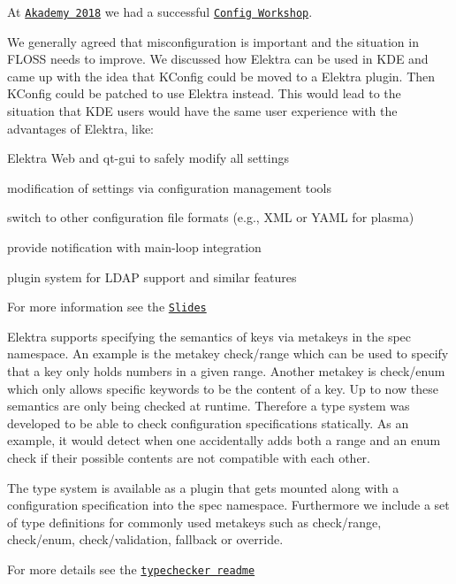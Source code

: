 At \href{https://akademy.kde.org/2018}{\tt Akademy 2018} we had a successful \href{https://community.kde.org/Akademy/2018/Config_Workshop}{\tt Config Workshop}.

We generally agreed that misconfiguration is important and the situation in F\+L\+O\+SS needs to improve. We discussed how Elektra can be used in K\+DE and came up with the idea that K\+Config could be moved to a Elektra plugin. Then K\+Config could be patched to use Elektra instead. This would lead to the situation that K\+DE users would have the same user experience with the advantages of Elektra, like\+:


\begin{DoxyItemize}
\item Elektra Web and qt-\/gui to safely modify all settings
\item modification of settings via configuration management tools
\item switch to other configuration file formats (e.\+g., X\+ML or Y\+A\+ML for plasma)
\item provide notification with main-\/loop integration
\item plugin system for L\+D\+AP support and similar features
\end{DoxyItemize}

For more information see the \href{http://www.complang.tuwien.ac.at/raab/akademy.pdf}{\tt Slides}

Elektra supports specifying the semantics of keys via metakeys in the {\ttfamily spec} namespace. An example is the metakey {\ttfamily check/range} which can be used to specify that a key only holds numbers in a given range. Another metakey is {\ttfamily check/enum} which only allows specific keywords to be the content of a key. Up to now these semantics are only being checked at runtime. Therefore a type system was developed to be able to check configuration specifications statically. As an example, it would detect when one accidentally adds both a range and an enum check if their possible contents are not compatible with each other.

The type system is available as a plugin that gets mounted along with a configuration specification into the spec namespace. Furthermore we include a set of type definitions for commonly used metakeys such as {\ttfamily check/range}, {\ttfamily check/enum}, {\ttfamily check/validation}, {\ttfamily fallback} or {\ttfamily override}.

For more details see the \href{https://www.libelektra.org/plugins/typechecker}{\tt typechecker readme}

